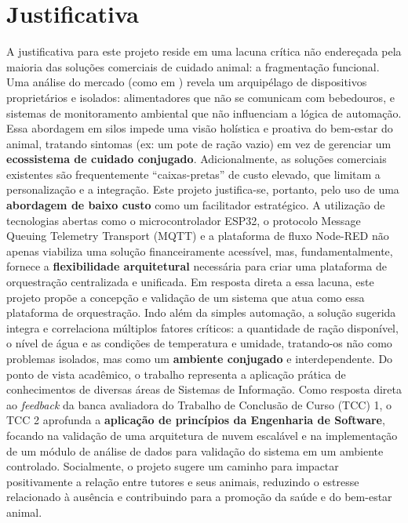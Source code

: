 \section{Justificativa}


A justificativa para este projeto reside em uma lacuna crítica não endereçada pela maioria das soluções comerciais de cuidado animal: a fragmentação funcional.
Uma análise do mercado (como em \cite{jacomini2024, circat_paper}) revela um arquipélago de dispositivos proprietários e isolados: alimentadores que não se comunicam com bebedouros, e sistemas de monitoramento ambiental que não influenciam a lógica de automação.
Essa abordagem em silos impede uma visão holística e proativa do bem-estar do animal, tratando sintomas (ex: um pote de ração vazio) em vez de gerenciar um \textbf{ecossistema de cuidado conjugado}.
Adicionalmente, as soluções comerciais existentes são frequentemente ``caixas-pretas'' de custo elevado, que limitam a personalização e a integração.
Este projeto justifica-se, portanto, pelo uso de uma \textbf{abordagem de baixo custo} como um facilitador estratégico.
A utilização de tecnologias abertas como o microcontrolador ESP32, o protocolo Message Queuing Telemetry Transport (MQTT) e a plataforma de fluxo Node-RED não apenas viabiliza uma solução financeiramente acessível, mas, fundamentalmente, fornece a \textbf{flexibilidade arquitetural} necessária para criar uma plataforma de orquestração centralizada e unificada.
Em resposta direta a essa lacuna, este projeto propõe a concepção e validação de um sistema que atua como essa plataforma de orquestração.
Indo além da simples automação, a solução sugerida integra e correlaciona múltiplos fatores críticos: a quantidade de ração disponível, o nível de água e as condições de temperatura e umidade, tratando-os não como problemas isolados, mas como um \textbf{ambiente conjugado} e interdependente.
Do ponto de vista acadêmico, o trabalho representa a aplicação prática de conhecimentos de diversas áreas de Sistemas de Informação.
Como resposta direta ao \textit{feedback} da banca avaliadora do Trabalho de Conclusão de Curso (TCC) 1, o TCC 2 aprofunda a \textbf{aplicação de princípios da Engenharia de Software}, focando na validação de uma arquitetura de nuvem escalável e na implementação de um módulo de análise de dados para validação do sistema em um ambiente controlado.
Socialmente, o projeto sugere um caminho para impactar positivamente a relação entre tutores e seus animais, reduzindo o estresse relacionado à ausência e contribuindo para a promoção da saúde e do bem-estar animal.

